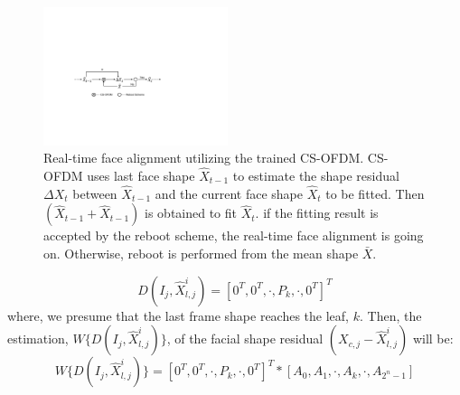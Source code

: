 \documentclass[a4paper, 10pt, conference]{ieeeconf}      %
\begin{document}
\begin{figure}
        \centering
        \includegraphics[width=0.48\textwidth]{fitting.pdf}%
        \caption{
        Real-time face alignment utilizing the trained CS-OFDM. CS-OFDM uses last face shape $\hat{X}_{t-1}$ to estimate the shape residual
        $\Delta X_t$ between $\hat{X}_{t-1}$ and the current face shape $\hat{X}_t$ to be fitted. Then $(\hat{X}_{t-1} +\hat{X}_{t-1})$ is obtained to
        fit $\hat{X}_t$. if the fitting result is accepted by the reboot scheme, the real-time face alignment is going on. Otherwise, reboot is
        performed from the mean shape $\bar{X}$.
        }
        \label{fig:fitting}
\end{figure}
\begin{equation}
    \label{e:barwq8}
    D(I_j,\hat{X}^i_{l,j}) = [0^T,0^T,\cdot,P_k,\cdot,0^T]^T
\end{equation}
where, we presume that the last frame shape reaches the leaf, $k$. Then, the estimation, $W\{D(I_j,\hat{X}^i_{l,j})\}$,
of the facial shape residual $(X_{c,j} - \hat{X}^i_{l,j})$ will be:
\begin{equation}
     W\{D(I_j,\hat{X}^i_{l,j})\} = [0^T,0^T,\cdot,P_k,\cdot,0^T]^T*[A_0,A_1,\cdot,A_k,\cdot,A_{2^n-1}]
\end{equation}
\end{document}
